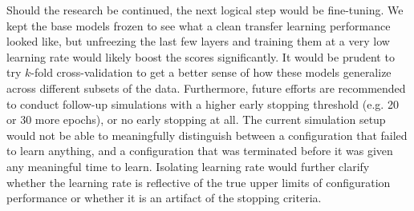Should the research be continued, the next logical step would be fine-tuning. We kept the base models frozen to see what a clean transfer learning performance looked like, but unfreezing the last few layers and training them at a very low learning rate would likely boost the scores significantly. It would be prudent to try $k$-fold cross-validation to get a better sense of how these models generalize across different subsets of the data. Furthermore, future efforts are recommended to conduct follow-up simulations with a higher early stopping threshold (e.g. 20 or 30 more epochs), or no early stopping at all. The current simulation setup would not be able to meaningfully distinguish between a configuration that failed to learn anything, and a configuration that was terminated before it was given any meaningful time to learn. Isolating learning rate would further clarify whether the learning rate is reflective of the true upper limits of configuration performance or whether it is an artifact of the stopping criteria. 
